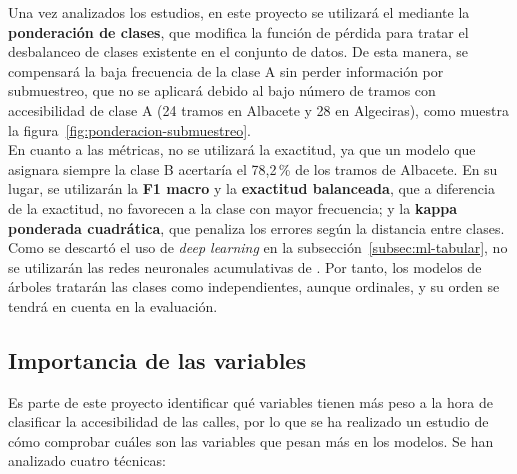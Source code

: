 Una vez analizados los estudios, en este proyecto se utilizará el \textbf{} mediante la \textbf{ponderación de clases}, que modifica la función de pérdida para tratar el desbalanceo de clases existente en el conjunto de datos. De esta manera, se compensará la baja frecuencia de la clase A sin perder información por submuestreo, que no se aplicará debido al bajo número de tramos con accesibilidad de clase A (24 tramos en Albacete y 28 en Algeciras), como muestra la figura~\ref{fig:ponderacion-submuestreo}.
\\



En cuanto a las métricas, no se utilizará la exactitud, ya que un modelo que asignara siempre la clase B acertaría el 78,2\,\% de los tramos de Albacete. En su lugar, se utilizarán la \textbf{F1 macro} y la \textbf{exactitud balanceada}, que a diferencia de la exactitud, no favorecen a la clase con mayor frecuencia; y la \textbf{kappa ponderada cuadrática}, que penaliza los errores según la distancia entre clases.
\\

Como se descartó el uso de \textit{deep learning} en la subsección~\ref{subsec:ml-tabular}, no se utilizarán las redes neuronales acumulativas de \textcite{agal2026}.
Por tanto, los modelos de árboles tratarán las clases como independientes, aunque ordinales, y su orden se tendrá en cuenta en la evaluación.
\\

\subsection{Importancia de las variables}
\label{subsec:ml-importancia}

Es parte de este proyecto identificar qué variables tienen más peso a la hora de clasificar la accesibilidad de las calles, por lo que se ha realizado un estudio de cómo comprobar cuáles son las variables que pesan más en los modelos. Se han analizado cuatro técnicas:

